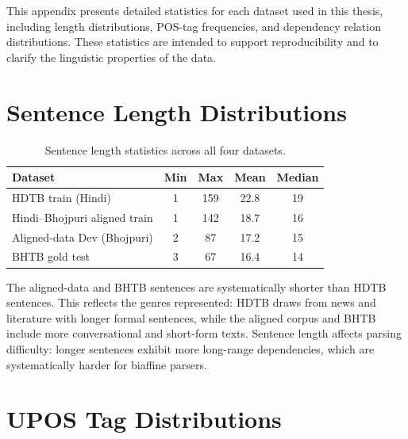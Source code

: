 \documentclass[12pt,a4paper,oneside]{report}
\begin{document}
This appendix presents detailed statistics for each dataset used in this
thesis, including length distributions, POS-tag frequencies, and dependency
relation distributions. These statistics are intended to support reproducibility
and to clarify the linguistic properties of the data.

\section{Sentence Length Distributions}

\begin{table}[ht]
\centering
\caption{Sentence length statistics across all four datasets.}
\label{tab:length_stats}
\begin{tabular}{@{}lcccc@{}}
\toprule
\textbf{Dataset} & \textbf{Min} & \textbf{Max} & \textbf{Mean} & \textbf{Median} \\
\midrule
HDTB train (Hindi)             & 1  & 159 & 22.8 & 19 \\
Hindi--Bhojpuri aligned train  & 1  & 142 & 18.7 & 16 \\
Aligned-data Dev (Bhojpuri)    & 2  & 87  & 17.2 & 15 \\
BHTB gold test                 & 3  & 67  & 16.4 & 14 \\
\bottomrule
\end{tabular}
\end{table}

The aligned-data and BHTB sentences are systematically shorter than HDTB
sentences. This reflects the genres represented: HDTB draws from news and
literature with longer formal sentences, while the aligned corpus and BHTB
include more conversational and short-form texts. Sentence length affects
parsing difficulty: longer sentences exhibit more long-range dependencies,
which are systematically harder for biaffine parsers.

\section{UPOS Tag Distributions}
\end{document}
